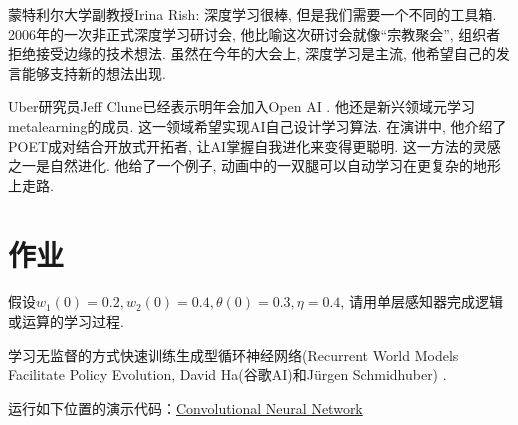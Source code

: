 蒙特利尔大学副教授Irina Rish: 深度学习很棒, 但是我们需要一个不同的工具箱.
2006年的一次非正式深度学习研讨会, 他比喻这次研讨会就像“宗教聚会”, 组织者拒绝接受边缘的技术想法.
虽然在今年的大会上, 深度学习是主流, 他希望自己的发言能够支持新的想法出现.

Uber研究员Jeff Clune已经表示明年会加入Open AI . 他还是新兴领域元学习metalearning的成员. 这一领域希望实现AI自己设计学习算法.
在演讲中, 他介绍了POET成对结合开放式开拓者, 让AI掌握自我进化来变得更聪明. 这一方法的灵感之一是自然进化. 他给了一个例子, 动画中的一双腿可以自动学习在更复杂的地形上走路.
\section{作业}
\begin{think}
假设$w_1(0)=0.2, w_2(0)=0.4, \theta(0)=0.3, \eta=0.4$, 请用单层感知器完成逻辑或运算的学习过程.
\end{think}

\begin{think}
学习无监督的方式快速训练生成型循环神经网络(Recurrent World Models Facilitate Policy Evolution, David Ha(谷歌AI)和Jürgen Schmidhuber) \cite{ha2018worldmodels}.
\end{think}

\begin{think}
  运行如下位置的演示代码：\href{https://colab.research.google.com/drive/16a3G7Hh8Pv1X1PhZAUBEnZEkXThzDeHJ#scrollTo=D_a2USyd4giE}{Convolutional Neural Network}
\end{think}
